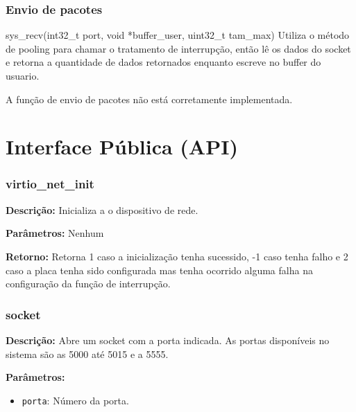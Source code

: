 \subsubsection{Envio de pacotes}


sys\_recv(int32\_t port, void *buffer\_user, uint32\_t tam\_max)
Utiliza o método de pooling para chamar o tratamento de interrupção, então lê os dados do socket e retorna a quantidade de dados retornados enquanto escreve no buffer do usuario.

A função de envio de pacotes não está corretamente implementada.





\section{Interface Pública (API)}
%
%

\subsubsection{virtio\_net\_init}

\textbf{Descrição:}
Inicializa a o dispositivo de rede.

\textbf{Parâmetros:}
Nenhum

\textbf{Retorno:}
Retorna 1 caso a inicialização tenha sucessido, -1 caso tenha falho e 2 caso a placa tenha sido configurada mas tenha ocorrido alguma falha na configuração da função de interrupção.


\subsubsection{socket}

\textbf{Descrição:}
Abre um socket com a porta indicada. As portas disponíveis no sistema são as 5000 até 5015 e a 5555.

\textbf{Parâmetros:}
\begin{itemize}
\item \texttt{porta}: Número da porta.
\end{itemize}

